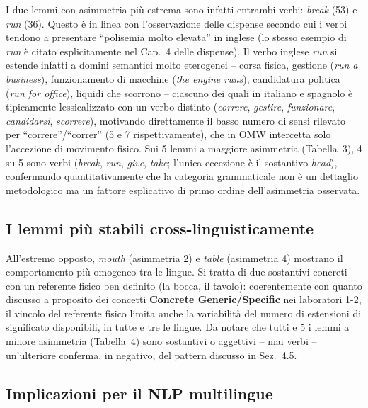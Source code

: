 \documentclass[12pt,a4paper]{article}
\begin{document}
I due lemmi con asimmetria pi\`u estrema sono infatti entrambi verbi: \textit{break} (53) e \textit{run} (36). Questo \`e in linea con l'osservazione delle dispense secondo cui i verbi tendono a presentare ``polisemia molto elevata'' in inglese (lo stesso esempio di \textit{run} \`e citato esplicitamente nel Cap.~4 delle dispense). Il verbo inglese \textit{run} si estende infatti a domini semantici molto eterogenei -- corsa fisica, gestione (\textit{run a business}), funzionamento di macchine (\textit{the engine runs}), candidatura politica (\textit{run for office}), liquidi che scorrono -- ciascuno dei quali in italiano e spagnolo \`e tipicamente lessicalizzato con un verbo distinto (\textit{correre}, \textit{gestire}, \textit{funzionare}, \textit{candidarsi}, \textit{scorrere}), motivando direttamente il basso numero di sensi rilevato per ``correre''/``correr'' (5 e 7 rispettivamente), che in OMW intercetta solo l'accezione di movimento fisico. Sui 5 lemmi a maggiore asimmetria (Tabella~3), 4 su 5 sono verbi (\textit{break}, \textit{run}, \textit{give}, \textit{take}; l'unica eccezione \`e il sostantivo \textit{head}), confermando quantitativamente che la categoria grammaticale non \`e un dettaglio metodologico ma un fattore esplicativo di primo ordine dell'asimmetria osservata.

\subsection{I lemmi pi\`u stabili cross-linguisticamente}

All'estremo opposto, \textit{mouth} (asimmetria 2) e \textit{table} (asimmetria 4) mostrano il comportamento pi\`u omogeneo tra le lingue. Si tratta di due sostantivi concreti con un referente fisico ben definito (la bocca, il tavolo): coerentemente con quanto discusso a proposito dei concetti \textbf{Concrete Generic/Specific} nei laboratori 1-2, il vincolo del referente fisico limita anche la variabilit\`a del numero di estensioni di significato disponibili, in tutte e tre le lingue. Da notare che tutti e 5 i lemmi a minore asimmetria (Tabella~4) sono sostantivi o aggettivi -- mai verbi -- un'ulteriore conferma, in negativo, del pattern discusso in Sez.~4.5.

\subsection{Implicazioni per il NLP multilingue}
\end{document}
